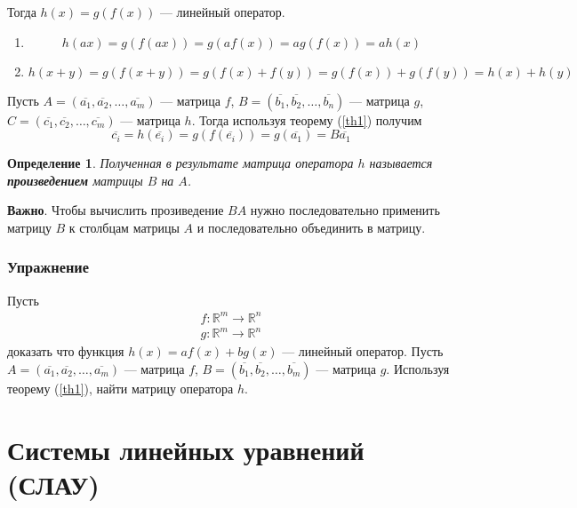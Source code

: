 \documentclass[]{article}
\newtheorem{dfn}{Определение}
\begin{document}
Тогда $h(x)=g(f(x))$ --- линейный оператор.

\begin{enumerate}
	\item
	\begin{equation*}
		h(ax)=g(f(ax))=g(af(x))=ag(f(x))=ah(x)
	\end{equation*}
	\item
\begin{equation*}
	h(x+y)=g(f(x+y))=g(f(x)+f(y))=g(f(x))+g(f(y))=h(x)+h(y)
\end{equation*}
\end{enumerate}


Пусть $A=(\overline{a_1},\overline{a_2},\ldots,\overline{a_m})$ --- матрица $f$, $B=(\overline{b_1},\overline{b_2},\ldots,\overline{b_n})$ --- матрица $g$, $C=(\overline{c_1},\overline{c_2},\ldots,\overline{c_m})$ --- матрица $h$. Тогда используя теорему (\ref{th1}) получим
\begin{equation*}
	\overline{c_i}=h(\overline{e_i})=g(f(\overline{e_i}))=g(\overline{a_1})=B\overline{a_1}
\end{equation*}

\begin{dfn}
	Полученная в результате матрица оператора $h$ называется \textbf{произведением} матрицы $B$ на $A$.
\end{dfn}

\textbf{Важно}. Чтобы вычислить прозиведение $BA$ нужно последовательно применить матрицу $B$ к столбцам матрицы $A$ и последовательно объединить в матрицу.

\subsubsection{Упражнение}
Пусть \begin{gather*}
	f:\mathbb{R}^m\rightarrow\mathbb{R}^n
	\\
	g:\mathbb{R}^m\rightarrow\mathbb{R}^n
\end{gather*}
доказать что функция $h(x)=af(x)+bg(x)$ --- линейный оператор. Пусть $A=(\overline{a_1},\overline{a_2},\ldots,\overline{a_m})$ --- матрица $f$, $B=(\overline{b_1},\overline{b_2},\ldots,\overline{b_m})$ --- матрица $g$. Используя теорему (\ref{th1}), найти матрицу оператора $h$.

\section{Системы линейных уравнений (СЛАУ)}
\end{document}
